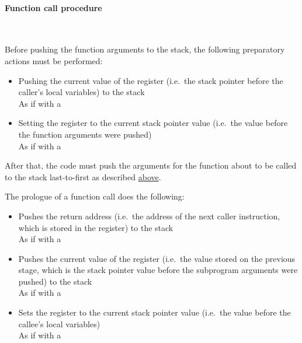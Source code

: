 \hypertarget{functions:call}{
    \paragraph{Function call procedure}\
}

\hypertarget{functions:prep}{}
Before pushing the function arguments to the stack, the following
preparatory actions must be performed:

\begin{itemize}
    \item Pushing the current value of the  register
    (i.e.\ the stack pointer before the caller's local variables)
    to the stack \\
    As if with a \hspace{-0.1cm}

    \item Setting the  register to the current stack pointer value
    (i.e.\ the value before the function arguments were pushed)\\
    As if with a \hspace{-0.1cm}
\end{itemize}

After that, the code must push the arguments for the function about to be called
to the stack last-to-first as described \hyperlink{karma:call:basic}{above}.

\hypertarget{functions:prologue}{}
The prologue of a function call does the following:

\begin{itemize}
    \item Pushes the return address (i.e.\ the address of the next
    caller instruction, which is stored in the \St{r15} register)
    to the stack \\
    As if with a \hspace{-0.1cm}

    \item Pushes the current value of the  register (i.e.\ the value
    stored on the previous stage, which is the stack pointer value
    before the subprogram arguments were pushed) to the stack \\
    As if with a \hspace{-0.1cm}

    \item Sets the  register to the current stack pointer value
    (i.e.\ the value before the callee's local variables) \\
    As if with a \hspace{-0.1cm}
\end{itemize}
